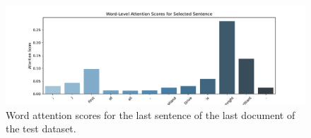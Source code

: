 \documentclass[a4paper]{article}
\begin{document}
\begin{figure}[H]
    \centering
    \includegraphics[width=.7\linewidth]{../figures/word_attention_scores.pdf}
    \caption{Word attention scores for the last sentence of the last document of the test dataset.}
    \label{word-scores}    
\end{figure}



\end{document}
